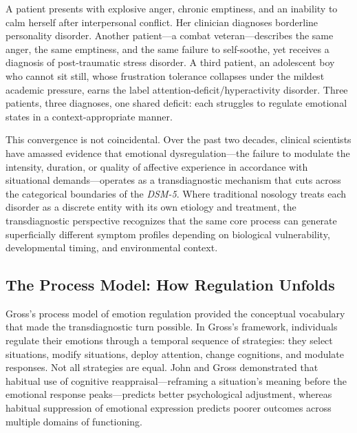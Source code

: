 



A patient presents with explosive anger, chronic emptiness, and an inability to
calm herself after interpersonal conflict.  Her clinician diagnoses borderline
personality disorder.  Another patient---a combat veteran---describes the same
anger, the same emptiness, and the same failure to self-soothe, yet receives a
diagnosis of post-traumatic stress disorder.  A third patient, an adolescent boy
who cannot sit still, whose frustration tolerance collapses under the mildest
academic pressure, earns the label attention-deficit/hyperactivity disorder.
Three patients, three diagnoses, one shared deficit: each struggles to regulate
emotional states in a context-appropriate manner.

This convergence is not coincidental.  Over the past two decades, clinical
scientists have amassed evidence that emotional dysregulation---the failure to
modulate the intensity, duration, or quality of affective experience in
accordance with situational demands---operates as a transdiagnostic mechanism
that cuts across the categorical boundaries of the \textit{DSM-5}.
Where traditional nosology treats each disorder as a discrete entity with its
own etiology and treatment, the transdiagnostic perspective recognizes that the
same core process can generate superficially different symptom profiles depending
on biological vulnerability, developmental timing, and environmental context.

\subsection*{The Process Model: How Regulation Unfolds}

Gross's process model of emotion regulation provided the conceptual vocabulary
that made the transdiagnostic turn possible.  In Gross's framework,
individuals regulate their emotions through a temporal sequence of strategies:
they select situations, modify situations, deploy attention, change cognitions,
and modulate responses.  Not all strategies are equal.  John and Gross
demonstrated that habitual use of cognitive reappraisal---reframing a situation's
meaning before the emotional response peaks---predicts better psychological
adjustment, whereas habitual suppression of emotional expression predicts poorer
outcomes across multiple domains of functioning.

